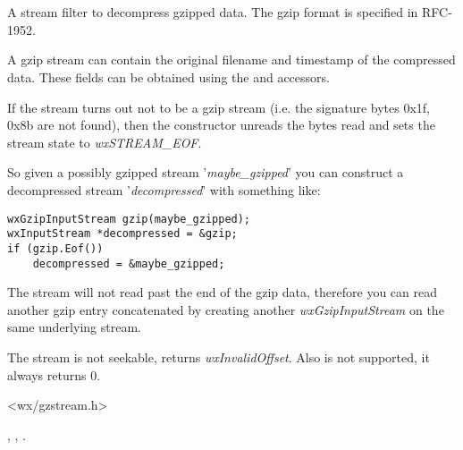 %

%
%

\section{}\label{wxgzipinputstream}

A stream filter to decompress gzipped data. The gzip format is specified in
RFC-1952.

A gzip stream can contain the original filename and timestamp of the
compressed data. These fields can be obtained using the
  and
  accessors.

If the stream turns out not to be a gzip stream (i.e. the signature bytes
0x1f, 0x8b are not found), then the constructor unreads the bytes read and
sets the stream state to {\it wxSTREAM\_EOF}.

So given a possibly gzipped stream '{\it maybe\_gzipped}' you can construct
a decompressed stream '{\it decompressed}' with something like:

\begin{verbatim}
wxGzipInputStream gzip(maybe_gzipped);
wxInputStream *decompressed = &gzip;
if (gzip.Eof())
    decompressed = &maybe_gzipped;

\end{verbatim}
The stream will not read past the end of the gzip data, therefore you
can read another gzip entry concatenated by creating another
 {\it wxGzipInputStream} on the same underlying stream.

The stream is not seekable,  returns
 {\it wxInvalidOffset}.  Also  is
not supported, it always returns $0$.




<wx/gzstream.h>


, 
 ,
 .



